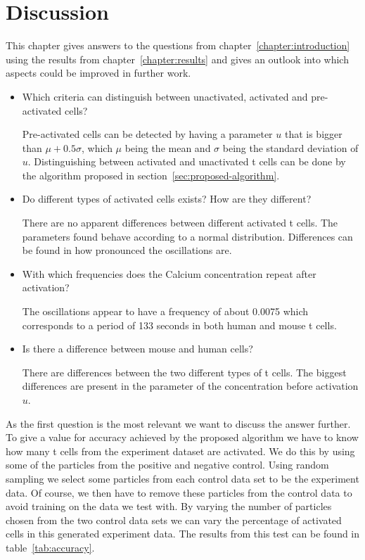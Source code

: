 \chapter{Discussion}
\label{chapter:conclusion}

This chapter gives answers to the questions from chapter~\ref{chapter:introduction} using the results from chapter~\ref{chapter:results} and gives an outlook into which aspects could be improved in further work.

\begin{itemize}
	\item Which criteria can distinguish between unactivated, activated and pre-activated cells?
	
	Pre-activated cells can be detected by having a parameter $u$ that is bigger than $\mu + 0.5 \sigma$, which $\mu$ being the mean and $\sigma$ being the standard deviation of $u$. Distinguishing between activated and unactivated t cells can be done by the algorithm proposed in section~\ref{sec:proposed-algorithm}.
	\item Do different types of activated cells exists? How are they different?
	
	There are no apparent differences between different activated t cells. The parameters found behave according to a normal distribution. Differences can be found in how pronounced the oscillations are.
	\item With which frequencies does the Calcium concentration repeat after activation?
	
	The oscillations appear to have a frequency of about 0.0075 which corresponds to a period of 133 seconds in both human and mouse t cells.
	\item Is there a difference between mouse and human cells?
	
	There are differences between the two different types of t cells. The biggest differences are present in the parameter of the \Calcium concentration before activation $u$.
\end{itemize}

As the first question is the most relevant we want to discuss the answer further. To give a value for accuracy achieved by the proposed algorithm we have to know how many t cells from the experiment dataset are activated. We do this by using some of the particles from the positive and negative control. Using random sampling we select some particles from each control data set to be the experiment data. Of course, we then have to remove these particles from the control data to avoid training on the data we test with. By varying the number of particles chosen from the two control data sets we can vary the percentage of activated cells in this generated experiment data. The results from this test can be found in table~\ref{tab:accuracy}.

